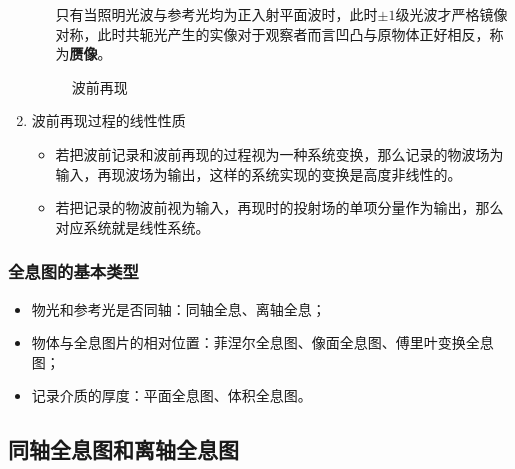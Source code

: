 \documentclass[UTF8]{ctexart}
\begin{document}
\begin{enumerate}
\begin{enumerate}
        只有当照明光波与参考光均为正入射平面波时，此时$\pm1$级光波才严格镜像对称，此时共轭光产生的实像对于观察者而言凹凸与原物体正好相反，称为\textbf{赝像}。
    \end{enumerate}
    \begin{figure}[htbp]
        \centering
        \caption{波前再现}
    \end{figure}
    \item 波前再现过程的线性性质

    \begin{itemize}
        \item 若把波前记录和波前再现的过程视为一种系统变换，那么记录的物波场为输入，再现波场为输出，这样的系统实现的变换是高度非线性的。
        \item 若把记录的物波前视为输入，再现时的投射场的单项分量作为输出，那么对应系统就是线性系统。
    \end{itemize}
     
\end{enumerate}

\subsubsection{全息图的基本类型}

\begin{itemize}
    \item 物光和参考光是否同轴：同轴全息、离轴全息；
    \item 物体与全息图片的相对位置：菲涅尔全息图、像面全息图、傅里叶变换全息图；
    \item 记录介质的厚度：平面全息图、体积全息图。
\end{itemize}

\subsection{同轴全息图和离轴全息图}
\end{document}
